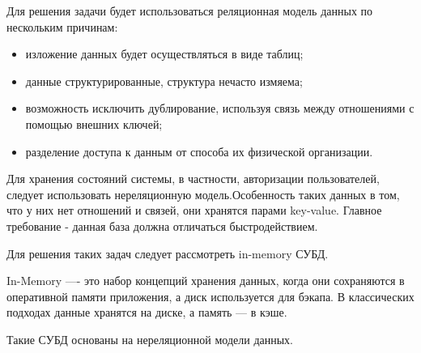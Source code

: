 Для решения задачи будет использоваться реляционная модель данных по нескольким причинам:

\begin{itemize}
    \item изложение данных будет осуществляться в виде таблиц;
    \item данные структурированные, структура нечасто измяема;
    \item возможность исключить дублирование, используя связь между отношениями с помощью внешних ключей;
    \item разделение доступа к данным от способа их физической организации.
\end{itemize}

Для хранения состояний системы, в частности, авторизации пользователей, следует использовать нереляционную модель.Особенность таких данных в том, что у них нет отношений и связей, они хранятся парами key-value. Главное требование - данная база должна отличаться быстродействием.

Для решения таких задач следует рассмотреть in-memory СУБД.

In-Memory —- это набор концепций хранения данных, когда они сохраняются в оперативной памяти приложения, а диск используется для бэкапа. В классических подходах данные хранятся на диске, а память — в кэше.

Такие СУБД основаны на нереляционной модели данных.  


